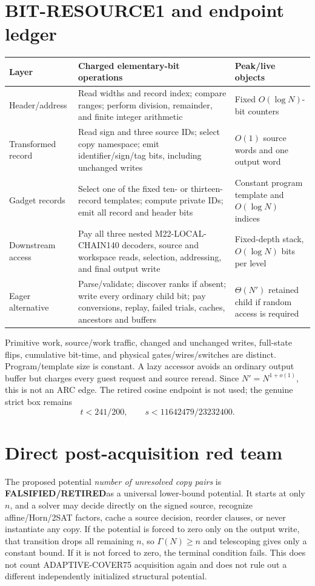 \documentclass[11pt]{article}
\newcommand{\RETIRED}{\textbf{FALSIFIED/RETIRED}}
\begin{document}
\section{BIT-RESOURCE1 and endpoint ledger}
\begin{longtable}{p{.20\linewidth}p{.52\linewidth}p{.20\linewidth}}
\toprule
Layer & Charged elementary-bit operations & Peak/live objects\\ \midrule
Header/address & Read widths and record index; compare ranges; perform
division, remainder, and finite integer arithmetic & Fixed
\(O(\log N)\)-bit counters\\
Transformed record & Read sign and three source IDs; select copy namespace;
emit identifier/sign/tag bits, including unchanged writes & \(O(1)\) source
words and one output word\\
Gadget records & Select one of the fixed ten- or thirteen-record templates;
compute private IDs; emit all record and header bits & Constant program
template and \(O(\log N)\) indices\\
Downstream access & Pay all three nested M22-LOCAL-CHAIN140 decoders, source
and workspace reads, selection, addressing, and final output write &
Fixed-depth stack, \(O(\log N)\) bits per level\\
Eager alternative & Parse/validate; discover ranks if absent; write every
ordinary child bit; pay conversions, replay, failed trials, caches, ancestors
and buffers & \(\Theta(N')\) retained child if random access is required\\
\bottomrule
\end{longtable}

Primitive work, source/work traffic, changed and unchanged writes,
full-state flips, cumulative bit-time, and physical gates/wires/switches are
distinct.  Program/template size is constant.  A lazy accessor avoids an
ordinary output buffer but charges every guest request and source reread.
Since \(N'=N^{1+o(1)}\), this is not an ARC edge.  The retired cosine
endpoint is not used; the genuine strict box remains
\[
t<241/200,\qquad s<11642479/23232400.
\]

\section{Direct post-acquisition red team}
The proposed potential \emph{number of unresolved copy pairs} is \RETIRED as
a universal lower-bound potential.  It starts at only \(n\), and a solver may
decide directly on the signed source, recognize affine/Horn/2SAT factors,
cache a source decision, reorder clauses, or never instantiate any copy.
If the potential is forced to zero only on the output write, that transition
drops all remaining \(n\), so \(\Gamma(N)\ge n\) and telescoping gives only a
constant bound.  If it is not forced to zero, the terminal condition fails.
This does not count ADAPTIVE-COVER75 acquisition again and does not rule out a
different independently initialized structural potential.
\end{document}
